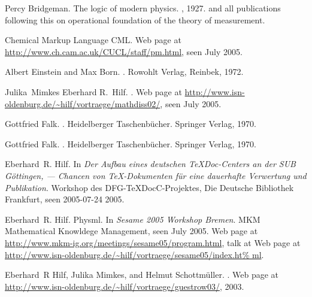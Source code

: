 \documentclass{llncs}
\def\seen{seen }
\def\July{July }
\def\webpageat{Web page at }
\begin{document}
%
%
\begin{thebibliography}{Koh06b}

Percy Bridgeman.
\newblock The logic of modern physics.
, 1927.
\newblock and all publications following this on operational foundation of the
  theory of measurement.

{Chemical Markup Language CML}.
\newblock \webpageat\url{http://www.ch.cam.ac.uk/CUCL/staff/pm.html},
  \seen\July 2005.

Albert Einstein and Max Born.
.
\newblock Rowohlt Verlag, Reinbek, 1972.

Julika~Mimkes Eberhard R.~Hilf.
.
\newblock
  \webpageat\url{http://www.isn-oldenburg.de/~hilf/vortraege/mathdiss02/},
  \seen\July 2005.

Gottfried Falk.
.
\newblock Heidelberger Taschenb\"ucher. Springer Verlag, 1970.

Gottfried Falk.
.
\newblock Heidelberger Taschenb\"ucher. Springer Verlag, 1970.

Eberhard~R. Hilf.
\newblock In {\em {Der Aufbau eines deutschen TeXDoc-Centers an der SUB
  G\"ottingen, --- Chancen von TeX-Dokumenten f\"ur eine dauerhafte Verwertung
  und Publikation}}. {Workshop des DFG-TeXDocC-Projektes, Die Deutsche
  Bibliothek Frankfurt}, \seen 2005-07-24 2005.

Eberhard~R. Hilf.
\newblock Physml.
\newblock In {\em Sesame 2005 Workshop Bremen}. MKM Mathematical Knowldege
  Management, \seen\July 2005.
\newblock \webpageat\url{http://www.mkm-ig.org/meetings/sesame05/program.html},
  talk at
  \webpageat\url{http://www.isn-oldenburg.de/~hilf/vortraege/sesame05/index.ht%
ml}.

Eberhard~R Hilf, Julika Mimkes, and Helmut Schottm\"uller.
.
\newblock \webpageat
  \url{http://www.isn-oldenburg.de/~hilf/vortraege/guestrow03/}, 2003.


\end{thebibliography}
\end{document}
